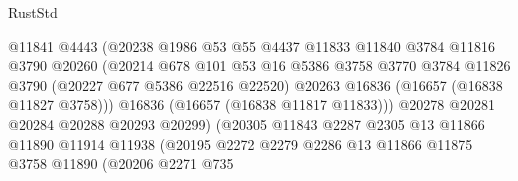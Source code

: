 \begin{lexlean}{RustStd}
\begin{coremodule}
                                    @11841
                                    @4443
                                    (@20238
                                      @1986
                                      @53
                                      @55
                                      @4437
                                      @11833
                                      @11840
                                      @3784
                                      @11816
                                      @3790
                                      @20260
                                      (@20214
                                        @678
                                        @101
                                        @53
                                        @16
                                        @5386
                                        @3758
                                        @3770
                                        @3784
                                        @11826
                                        @3790
                                        (@20227 @677 @5386 @22516 @22520)
                                        @20263
                                        @16836
                                        (@16657 (@16838 @11827 @3758)))
                                      @16836
                                      (@16657 (@16838 @11817 @11833)))
                                    @20278
                                    @20281
                                    @20284
                                    @20288
                                    @20293
                                    @20299)
                                  (@20305
                                    @11843
                                    @2287
                                    @2305
                                    @13
                                    @11866
                                    @11890
                                    @11914
                                    @11938
                                    (@20195
                                      @2272
                                      @2279
                                      @2286
                                      @13
                                      @11866
                                      @11875
                                      @3758
                                      @11890
                                      (@20206
                                        @2271
                                        @735

\end{coremodule}
\end{lexlean}
